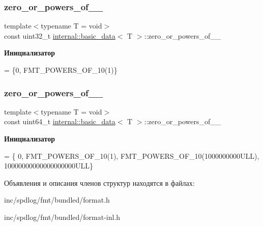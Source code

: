 \subsubsection{\texorpdfstring{zero\+\_\+or\+\_\+powers\+\_\+of\+\_\+\_}{zero\_or\_powers\_of\_10\_32}}
{\footnotesize\ttfamily template$<$typename T = void$>$ \\
const uint32\+\_\+t \hyperlink{structinternal_1_1basic__data}{internal\+::basic\+\_\+data}$<$ T $>$\+::zero\+\_\+or\+\_\+powers\+\_\+of\+\_\+\_\hspace{0.3cm}{\ttfamily [static]}}

{\bfseries Инициализатор}
\begin{DoxyCode}
= \{0,
                                                           FMT\_POWERS\_OF\_10(1)\}
\end{DoxyCode}
\mbox{\label{structinternal_1_1basic__data_a03c8bccb2f6fe7d2956fba74b4fe35ac}} 
\subsubsection{\texorpdfstring{zero\+\_\+or\+\_\+powers\+\_\+of\+\_\+\_}{zero\_or\_powers\_of\_10\_64}}
{\footnotesize\ttfamily template$<$typename T = void$>$ \\
const uint64\+\_\+t \hyperlink{structinternal_1_1basic__data}{internal\+::basic\+\_\+data}$<$ T $>$\+::zero\+\_\+or\+\_\+powers\+\_\+of\+\_\+\_\hspace{0.3cm}{\ttfamily [static]}}

{\bfseries Инициализатор}
\begin{DoxyCode}
= \{
    0, FMT\_POWERS\_OF\_10(1), FMT\_POWERS\_OF\_10(1000000000ULL),
    10000000000000000000ULL\}
\end{DoxyCode}


Объявления и описания членов структур находятся в файлах\+:\begin{DoxyCompactItemize}
\item 
inc/spdlog/fmt/bundled/format.\+h\item 
inc/spdlog/fmt/bundled/format-\/inl.\+h\end{DoxyCompactItemize}
